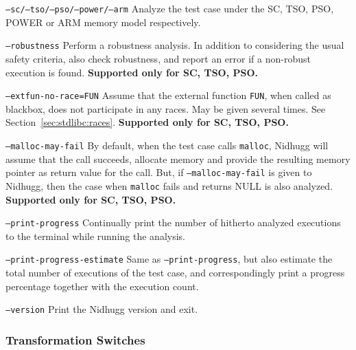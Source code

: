 \documentclass[a4paper]{article}
\newcommand{\limitsupport}[1]{\textbf{Supported only for #1.}}
\begin{document}
\begin{description}
\item{\texttt{--sc/--tso/--pso/--power/--arm}}
%
  Analyze the test case under the SC, TSO, PSO, POWER or ARM memory
  model respectively.
\item{\texttt{--robustness}}
%
  Perform a robustness analysis. In addition to considering the usual
  safety criteria, also check robustness, and report an error if a
  non-robust execution is found.
%
  \limitsupport{SC, TSO, PSO}
\item{\texttt{--extfun-no-race=FUN}}
%
  Assume that the external function \texttt{FUN}, when called as
  blackbox, does not participate in any races. May be given several
  times. See Section~\ref{sec:stdlibc:races}.
%
  \limitsupport{SC, TSO, PSO}
\item{\texttt{--malloc-may-fail}}
%
  By default, when the test case calls \texttt{malloc}, Nidhugg will
  assume that the call succeeds, allocate memory and provide the
  resulting memory pointer as return value for the call. But, if
  \texttt{--malloc-may-fail} is given to Nidhugg, then the case when
  \texttt{malloc} fails and returns NULL is also analyzed.
%
  \limitsupport{SC, TSO, PSO}
\item{\texttt{--print-progress}}
%
  Continually print the number of hitherto analyzed executions to the
  terminal while running the analysis.
\item{\texttt{--print-progress-estimate}}
%
  Same as \texttt{--print-progress}, but also estimate the total
  number of executions of the test case, and correspondingly print a
  progress percentage together with the execution count.
\item{\texttt{--version}}
%
  Print the Nidhugg version and exit.
\end{description}

\subsubsection{Transformation Switches}\label{sec:transform:switches}
\end{document}
